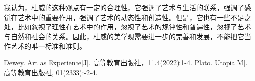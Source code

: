 \documentclass[twocolumn]{ctexart}
\begin{document}
		我认为，杜威的这种观点有一定的合理性，它强调了艺术与生活的联系，强调了感觉在艺术中的重要作用，强调了艺术的动态性和创造性。但是，它也有一些不足之处，比如忽视了理性在艺术中的作用，忽视了艺术的规律性和普遍性，忽视了艺术与自然和社会的关系。因此，杜威的美学观需要进一步的完善和发展，不能把它当作艺术的唯一标准和准则。
	
	
	
	
	
	\begin{thebibliography}{99}%
		Dewey. Art as Experience[J]. 高等教育出版社，11.4(2022):1-4.
		Plato. Utopia[M]. 高等教育出版社, 01(2333):-2-4.
	\end{thebibliography}
\end{document}
